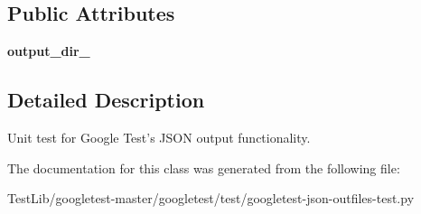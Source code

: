 \subsection*{Public Attributes}
\begin{DoxyCompactItemize}
\item 
\mbox{\label{classgoogletest-json-outfiles-test_1_1GTestJsonOutFilesTest_a18e262639002fb485155961593efad20}} 
{\bfseries output\+\_\+dir\+\_\+}
\end{DoxyCompactItemize}


\subsection{Detailed Description}
\begin{DoxyVerb}Unit test for Google Test's JSON output functionality.\end{DoxyVerb}
 

The documentation for this class was generated from the following file\+:\begin{DoxyCompactItemize}
\item 
Test\+Lib/googletest-\/master/googletest/test/googletest-\/json-\/outfiles-\/test.\+py\end{DoxyCompactItemize}
